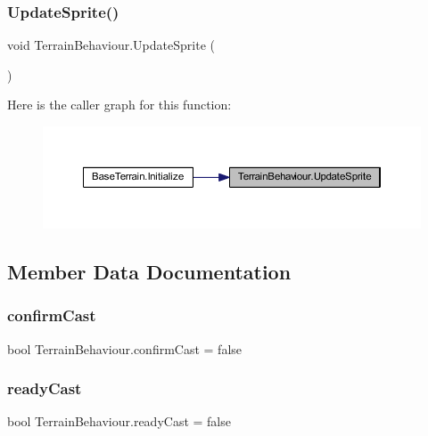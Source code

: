 \subsubsection{\texorpdfstring{UpdateSprite()}{UpdateSprite()}}
{\footnotesize\ttfamily void Terrain\+Behaviour.\+Update\+Sprite (\begin{DoxyParamCaption}{ }\end{DoxyParamCaption})}

Here is the caller graph for this function\+:\nopagebreak
\begin{figure}[H]
\begin{center}
\leavevmode
\includegraphics[width=350pt]{class_terrain_behaviour_a1f1234296c90b45abf0ad3ee6f9e78ac_icgraph}
\end{center}
\end{figure}


\subsection{Member Data Documentation}
\mbox{\label{class_terrain_behaviour_a36547c4343110b97274e7c3c8d3b5ff2}} 
\subsubsection{\texorpdfstring{confirmCast}{confirmCast}}
{\footnotesize\ttfamily bool Terrain\+Behaviour.\+confirm\+Cast = false}

\mbox{\label{class_terrain_behaviour_a31d1471342a45dcdc36a0c0f78680d0f}} 
\subsubsection{\texorpdfstring{readyCast}{readyCast}}
{\footnotesize\ttfamily bool Terrain\+Behaviour.\+ready\+Cast = false}

